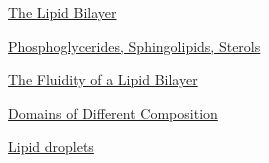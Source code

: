 \documentclass[12pt,letterpaper]{article}
\begin{document}
\hypertarget{10.1}{}
\begin{secbox}{\hyperlink{10}{The Lipid Bilayer}}{

}\end{secbox}
\hypertarget{10.2}{}
\begin{secbox}{\hyperlink{10}{Phosphoglycerides, Sphingolipids, Sterols}}{

}\end{secbox}
\hypertarget{10.3}{}
\begin{secbox}{\hyperlink{10}{The Fluidity of a Lipid Bilayer}}{

}\end{secbox}
\hypertarget{10.4}{}
\begin{secbox}{\hyperlink{10}{Domains of Different Composition}}{

}\end{secbox}
\hypertarget{10.5}{}
\begin{secbox}{\hyperlink{10}{Lipid droplets}}{

}\end{secbox}
\end{document}
